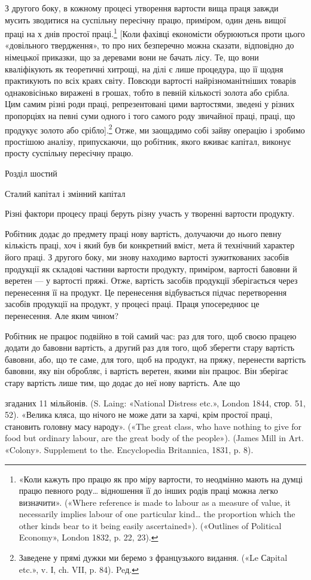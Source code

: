 З    другого боку, в кожному процесі утворення вартости вища
праця завжди мусить зводитися на суспільну пересічну працю,
приміром, один день вищої праці на х днів простої праці.\footnote{
«Коли кажуть про працю як про міру вартости, то неодмінно мають
на думці працю певного роду\dots{} відношення її до інших родів праці можна
легко визначити». («Where reference is made to labour as a measure of
value, it necessarily implies labour of one particular kind\dots{} the proportion
which the other kinds bear to it being easily ascertained»). («Outlines of
Political Economy», London 1832, p. 22, 23).
} [Коли
фахівці економісти обурюються проти цього «довільного твердження»,
то про них безперечно можна сказати, відповідно до
німецької приказки, що за деревами вони не бачать лісу. Те, що
вони кваліфікують як теоретичні хитрощі, на ділі є лише процедура,
що її щодня практикують по всіх краях світу. Повсюди
вартості найрізноманітніших товарів однаковісінько виражені
в грошах, тобто в певній кількості золота або срібла. Цим самим
різні роди праці, репрезентовані цими вартостями, зведені у
різних пропорціях на певні суми одного і того самого роду звичайної
праці, праці, що продукує золото або срібло].\footnote*{
Заведене у прямі дужки ми беремо з французького видання. («Le Саpital
etc.», v. І, ch. VII, p. 84). Peд.
} Отже,
ми заощадимо собі зайву операцію і зробимо простішою аналізу,
припускаючи, що робітник, якого вживає капітал, виконує
просту суспільну пересічну працю.

Розділ шостий

Сталий капітал і змінний капітал

Різні фактори процесу праці беруть різну участь у творенні
вартости продукту.

Робітник додає до предмету праці нову вартість, долучаючи
до нього певну кількість праці, хоч і який був би конкретний
вміст, мета й технічний характер його праці. З другого боку, ми
знову находимо вартості зужиткованих засобів продукції як
складові частини вартости продукту, приміром, вартості бавовни
й веретен — у вартості пряжі. Отже, вартість засобів продукції
зберігається через перенесення її на продукт. Це перенесення
відбувається підчас перетворення засобів продукції на продукт,
у процесі праці. Праця упосереднює це перенесення. Але яким
чином?

Робітник не працює подвійно в той самий час: раз для того,
щоб своєю працею додати до бавовни вартість, а другий раз для
того, щоб зберегти стару вартість бавовни, або, що те саме, для
того, щоб на продукт, на пряжу, перенести вартість бавовни, яку
він обробляє, і вартість веретен, якими він працює. Він зберігає
стару вартість лише тим, що додає до неї нову вартість. Але що

згаданих 11 мільйонів. (S. Laing: «National Distress etc.», London
1844, стор. 51, 52). «Велика кляса, що нічого не може дати за харчі,
крім простої праці, становить головну масу народу». («The great class,
who have nothing to give for food but ordinary labour, are the great body
of the people»). (James Mill in Art. «Colony». Supplement to the. Encyclopedia
Britannica, 1831, p. 8).
\parbreak{}  %
